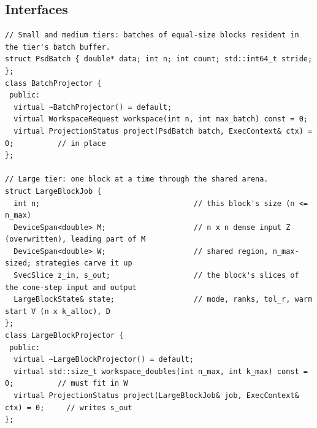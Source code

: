 \documentclass[11pt]{article}
\begin{document}
\subsection{Interfaces}
\begin{lstlisting}
// Small and medium tiers: batches of equal-size blocks resident in the tier's batch buffer.
struct PsdBatch { double* data; int n; int count; std::int64_t stride; };
class BatchProjector {
 public:
  virtual ~BatchProjector() = default;
  virtual WorkspaceRequest workspace(int n, int max_batch) const = 0;
  virtual ProjectionStatus project(PsdBatch batch, ExecContext& ctx) = 0;          // in place
};

// Large tier: one block at a time through the shared arena.
struct LargeBlockJob {
  int n;                                   // this block's size (n <= n_max)
  DeviceSpan<double> M;                    // n x n dense input Z (overwritten), leading part of M
  DeviceSpan<double> W;                    // shared region, n_max-sized; strategies carve it up
  SvecSlice z_in, s_out;                   // the block's slices of the cone-step input and output
  LargeBlockState& state;                  // mode, ranks, tol_r, warm start V (n x k_alloc), D
};
class LargeBlockProjector {
 public:
  virtual ~LargeBlockProjector() = default;
  virtual std::size_t workspace_doubles(int n_max, int k_max) const = 0;          // must fit in W
  virtual ProjectionStatus project(LargeBlockJob& job, ExecContext& ctx) = 0;     // writes s_out
};
\end{lstlisting}
\end{document}
